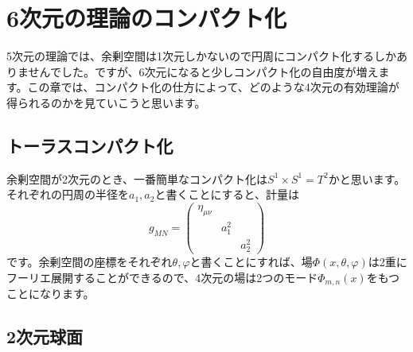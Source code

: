 \documentclass[unicode,a4paper,11pt]{ltjsarticle}
\begin{document}
\section{6次元の理論のコンパクト化}

5次元の理論では、余剰空間は1次元しかないので円周にコンパクト化するしかありませんでした。ですが、6次元になると少しコンパクト化の自由度が増えます。この章では、コンパクト化の仕方によって、どのような4次元の有効理論が得られるのかを見ていこうと思います。

\subsection{トーラスコンパクト化}

余剰空間が2次元のとき、一番簡単なコンパクト化は$S^{1}\times S^{1}=T^{2}$かと思います。それぞれの円周の半径を$a_{1},a_{2}$と書くことにすると、計量は
\begin{equation}
   g_{MN}
   =
   \begin{pmatrix}
      \eta_{\mu\nu} &         &         \\
                    & a_{1}^2 &         \\
                    &         & a_{2}^2
   \end{pmatrix}
\end{equation}
です。余剰空間の座標をそれぞれ$\theta,\varphi$と書くことにすれば、場$\Phi(x,\theta,\varphi)$は2重にフーリエ展開することができるので、4次元の場は2つのモード$\Phi_{m,n}(x)$をもつことになります。


\subsection{2次元球面}
\end{document}
